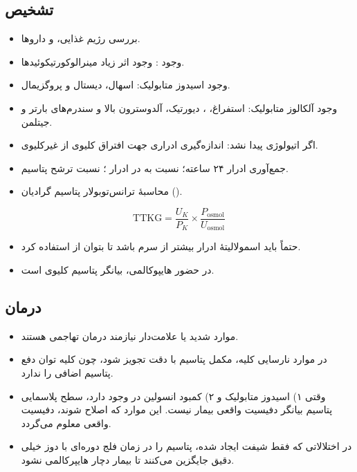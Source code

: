 \documentclass[11pt,a4paper]{article}
\begin{document}
\subsection*{تشخیص}
\begin{itemize}
\item بررسی رژیم غذایی،  و داروها.
\item وجود : وجود اثر زیاد مینرالوکورتیکوئیدها.
\item وجود اسیدوز متابولیک: اسهال،  دیستال و پروگزیمال.
\item وجود آلکالوز متابولیک: استفراغ، ، دیورتیک، آلدوسترون بالا و سندرم‌های بارتر و جیتلمن.
\item اگر اتیولوژی پیدا نشد: اندازه‌گیری  ادراری جهت افتراق  کلیوی از غیرکلیوی.
\item جمع‌آوری ادرار ۲۴ ساعته؛ نسبت  به  در ادرار ؛ نسبت ترشح پتاسیم.
\item محاسبهٔ ترانس‌توبولار پتاسیم گرادیان ().
\end{itemize}
\begin{equation*}
\mathrm{TTKG}=\frac{U_K}{P_K}\times\frac{P_{\mathrm{osmol}}}{U_{\mathrm{osmol}}}
\end{equation*}
\begin{itemize}
\item حتماً باید اسمولالیتهٔ ادرار بیشتر از سرم باشد تا بتوان از  استفاده کرد.
\item {} در حضور هایپوکالمی، بیانگر  پتاسیم کلیوی است.
\end{itemize}
\subsection*{درمان}
\begin{itemize}
\item موارد شدید یا علامت‌دار نیازمند درمان تهاجمی هستند.
\item در موارد نارسایی کلیه، مکمل پتاسیم با دقت تجویز شود، چون کلیه توان دفع پتاسیم اضافی را ندارد.
\item وقتی ۱) اسیدوز متابولیک و ۲) کمبود انسولین در  وجود دارد، سطح پلاسمایی پتاسیم بیانگر دفیسیت واقعی بیمار نیست. این موارد که اصلاح شوند، دفیسیت واقعی معلوم می‌گردد.
\item در اختلالاتی که فقط شیفت ایجاد شده، پتاسیم را در زمان فلج دوره‌ای با دوز خیلی دقیق جایگزین می‌کنند تا بیمار دچار هایپرکالمی نشود. %
\end{itemize}
\end{document}
